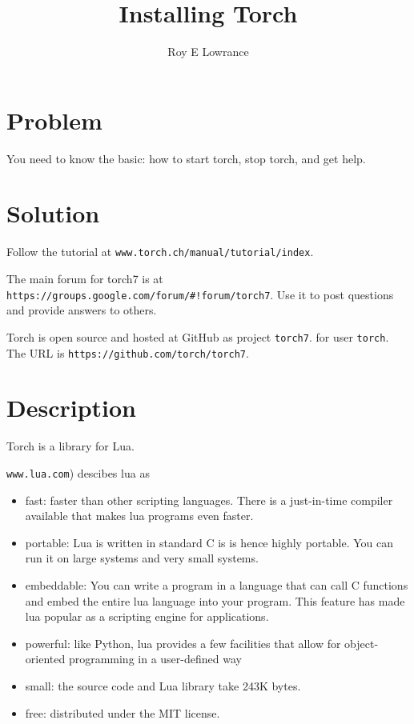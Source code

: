 \documentclass{article}
\let\code\texttt %
\begin{document}
\title{Installing Torch}
\author{Roy E Lowrance}
\maketitle


\section{Problem}
You need to know the basic: how to start torch, stop torch, and get
help.

\section{Solution}

Follow the tutorial at \code{www.torch.ch/manual/tutorial/index}.

The main forum for torch7  is at 
\code{https://groups.google.com/forum/\#!forum/torch7}. Use it to post
questions and provide answers to others.

Torch is open source and hosted at GitHub as project \code{torch7}. for
user \code{torch}. The URL is \code{https://github.com/torch/torch7}. 

\section{Description}

Torch is a library for Lua.

\code{www.lua.com}) descibes lua as
\begin{itemize}
  \item fast: faster than other scripting languages. There is a
    just-in-time compiler available that makes lua programs even faster.
  \item portable: Lua is written in standard C is is hence highly
    portable. You can run it on large systems and very small systems.
  \item embeddable: You can write a program in a language that can call
    C functions and embed the entire lua language into your program.
    This feature has made lua popular as a scripting engine for
    applications.
  \item powerful: like Python, lua provides a few facilities that allow
    for object-oriented programming in a user-defined way
  \item small: the source code and Lua library take 243K bytes.
  \item free: distributed under the MIT license.
\end{itemize}
\end{document}
